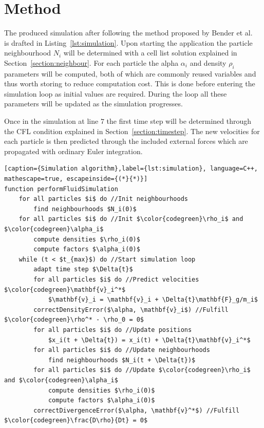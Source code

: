 \section{Method}

The produced simulation after following the method proposed by Bender et al.~\cite{bender} is drafted in Listing~\ref{lst:simulation}. 
Upon starting the application the particle neighbourhood $N_i$ will be determined with a cell list solution explained in Section~\ref{section:neighbour}.
For each particle the alpha $\alpha_i$ and density $\rho_i$ parameters will be computed, both of which are commonly reused variables and thus worth storing to reduce computation cost.
This is done before entering the simulation loop as initial values are required.
During the loop all these parameters will be updated as the simulation progresses.

Once in the simulation at line $7$ the first time step will be determined through the CFL condition explained in Section~\ref{section:timestep}.
The new velocities for each particle is then predicted through the included external forces which are propagated with ordinary Euler integration.

\begin{lstlisting}[caption={Simulation algorithm},label={lst:simulation}, language=C++, mathescape=true, escapeinside={(*}{*)}] 
function performFluidSimulation
    for all particles $i$ do //Init neighbourhoods
        find neighbourhoods $N_i(0)$
    for all particles $i$ do //Init $\color{codegreen}\rho_i$ and $\color{codegreen}\alpha_i$
        compute densities $\rho_i(0)$
        compute factors $\alpha_i(0)$
    while (t < $t_{max}$) do //Start simulation loop
        adapt time step $\Delta{t}$ 
        for all particles $i$ do //Predict velocities $\color{codegreen}\mathbf{v}_i^*$
            $\mathbf{v}_i = \mathbf{v}_i + \Delta{t}\mathbf{F}_g/m_i$
        correctDensityError($\alpha, \mathbf{v}_i$) //Fulfill $\color{codegreen}\rho^* - \rho_0 = 0$
        for all particles $i$ do //Update positions
            $x_i(t + \Delta{t}) = x_i(t) + \Delta{t}\mathbf{v}_i^*$
        for all particles $i$ do //Update neighbourhoods
            find neighbourhoods $N_i(t + \Delta{t})$
        for all particles $i$ do //Update $\color{codegreen}\rho_i$ and $\color{codegreen}\alpha_i$ 
            compute densities $\rho_i(0)$
            compute factors $\alpha_i(0)$
        correctDivergenceError($\alpha, \mathbf{v}^*$) //Fulfill $\color{codegreen}\frac{D\rho}{Dt} = 0$
\end{lstlisting}

